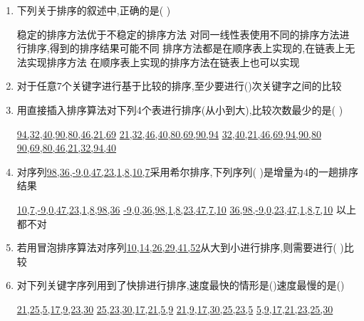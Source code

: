\documentclass[12pt, a4paper, oneside, UTF8]{ctexbook}
\begin{document}
\begin{enumerate}
    \item 下列关于排序的叙述中,正确的是(   ) 
    \begin{choices}[1]
        \task 稳定的排序方法优于不稳定的排序方法
        \task 对同一线性表使用不同的排序方法进行排序,得到的排序结果可能不同
        \task 排序方法都是在顺序表上实现的,在链表上无法实现排序方法
        \task 在顺序表上实现的排序方法在链表上也可以实现
    \end{choices}

    \item 对于任意7个关键字进行基于比较的排序,至少要进行()次关键字之间的比较
    \begin{choices}
    \end{choices}


    \item 用直接插入排序算法对下列4个表进行排序(从小到大),比较次数最少的是(   ) 
    \begin{choices}[2]
        \task \underline{94,32,40,90,80,46,21,69}
        \task \underline{21,32,46,40,80,69,90,94}
        \task \underline{32,40,21,46,69,94,90,80}
        \task \underline{90,69,80,46,21,32,94,40}
    \end{choices}


    \item 对序列\underline{98,36,-9,0,47,23,1,8,10,7}采用希尔排序,下列序列( )是增量为4的一趟排序结果 
    \begin{choices}[2]
        \task \underline{10,7,-9,0,47,23,1,8,98,36}
        \task \underline{-9,0,36,98,1,8,23,47,7,10}
        \task \underline{36,98,-9,0,23,47,1,8,7,10}
        \task 以上都不对
    \end{choices}


    \item 若用冒泡排序算法对序列\underline{10,14,26,29,41,52}从大到小进行排序,则需要进行(  )比较 
    \begin{choices}
    \end{choices}




    \item 对下列关键字序列用到了快排进行排序,速度最快的情形是()速度最慢的是() 
    \begin{choices}[2]
        \task \underline{21,25,5,17,9,23,30}
        \task \underline{25,23,30,17,21,5,9}
        \task \underline{21,9,17,30,25,23,5}
        \task \underline{5,9,17,21,23,25,30}
    \end{choices}



\end{enumerate}
\end{document}
